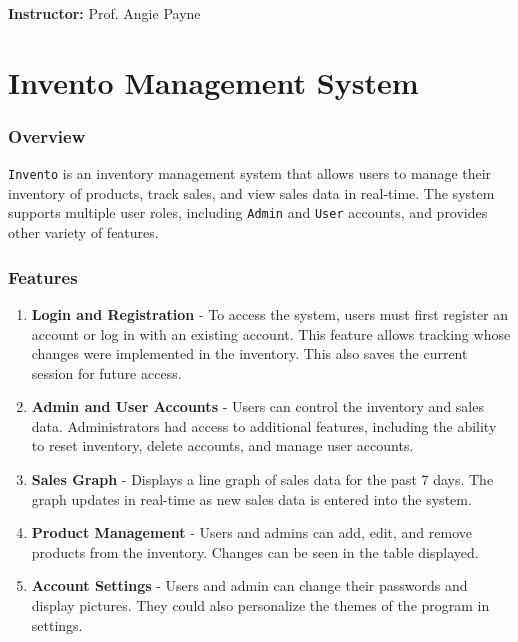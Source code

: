 \documentclass[12pt,a4paper]{article}
\renewcommand{\indent}{\hspace\parindent}
\begin{document}
        \noindent\textbf{Instructor:} Prof. Angie Payne

    \newpage
    \thispagestyle{plain}
    \tableofcontents

    \newpage
    \setcounter{page}{1}
    \part{ Invento Management System }

    \section*{Overview \hrulefill}
        \indent
        \texttt{Invento} is an inventory management system that allows users to 
        manage their inventory of products, track sales, and view sales data in 
        real-time. The system supports multiple user roles, including \texttt{Admin} 
        and \texttt{User} accounts, and provides other variety of features.

        \noindent\hrulefill

    \section*{Features}

        \begin{enumerate}
            \item{\textbf{Login and Registration}} - To access the system, users must 
                first register an account or log in with an existing account. This 
                feature allows tracking whose changes were implemented in the 
                inventory. This also saves the current session for future access.
            \item{\textbf{Admin and User Accounts}} - Users can control the inventory 
                and sales data. Administrators had access to additional features, 
                including the ability to reset inventory, delete accounts, and manage 
                user accounts.
            \item{\textbf{Sales Graph}} - Displays a line graph of sales data for the 
                past 7 days. The graph updates in real-time as new sales data is 
                entered into the system.
            \item{\textbf{Product Management}} - Users and admins can add, edit, and 
                remove products from the inventory. Changes can be seen in the table 
                displayed.
            \item{\textbf{Account Settings}} - Users and admin can change their 
                passwords and display pictures. They could also personalize the 
                themes of the program in settings.
        \end{enumerate}
        
\end{document}
